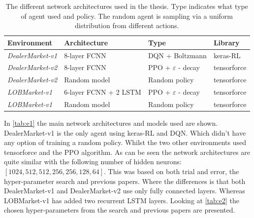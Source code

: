 \documentclass{kththesis}
\theoremstyle{definition}
\begin{document}
\begin{table}[H]
\centering
\caption{The different network architectures used in the thesis. Type indicates what type of agent used and policy. The random agent is sampling via a uniform distribution from different actions.}
\label{tab:e1}
\begin{tabular}{llll}
 \textbf{Environment} & \textbf{Architecture}  & \textbf{Type}  & \textbf{Library}  \\ \hline
 \textit{DealerMarket-v1}& 8-layer FCNN  & DQN + Boltzmann  & keras-RL   \\
 \textit{DealerMarket-v2}& 8-layer FCNN  & PPO + $\varepsilon$ - decay  & tensorforce  \\
 \textit{DealerMarket-v2} & Random model  & Random policy  & tensorforce \\
 \textit{LOBMarket-v1} & 6-layer FCNN + 2 LSTM  & PPO + $\varepsilon$ - decay  & tensorforce \\ 
 \textit{LOBMarket-v1} & Random model  & Random policy  & tensorforce
\end{tabular}
\end{table}
In \autoref{tab:e1} the main network architectures and models used are shown. DealerMarket-v1 is the only agent using keras-RL and DQN. Which didn't have any option of training a random policy. Whilst the two other environments used tensorforce and the PPO algorithm. As can be seen the network architectures are quite similar with the following number of hidden neurons: $[1024, 512,512,256,256,128,64]$. This was based on both trial and error, the hyper-parameter search and previous papers. 
\newline
\newline
Where the differences is that both DealerMarket-v1 and DealerMarket-v2 use only fully connected layers. Whereas LOBMarket-v1 has added two recurrent LSTM layers. Looking at \autoref{tab:e2} the chosen hyper-parameters from the search and previous papers are presented.
\end{document}
